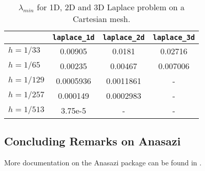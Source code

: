 \begin{table}[htbp]
  \centering
  \begin{tabular}{| l | c c c |}    
    \hline
& {\tt laplace\_1d} & {\tt laplace\_2d} &{\tt laplace\_3d} \\
     \hline
     $h = 1/33$ & 0.00905 & 0.0181 & 0.02716 \\
     $h = 1/65$ & 0.00235  & 0.00467 & 0.007006 \\
     $h = 1/129$ & 0.0005936 & 0.0011861 & - \\
     $h = 1/257$ & 0.000149 & 0.0002983 & - \\
     $h = 1/513$ & 3.75e-5 & - & - \\
     \hline
  \end{tabular}
  \caption{$\lambda_{min}$ for 1D, 2D and 3D Laplace problem on a Cartesian mesh.}
  \label{tab:anasazi:Lapl}
\end{table}




\subsection{Concluding Remarks on Anasazi}
\label{sec:anasazi_concluding}

More documentation on the Anasazi package can be found in
\cite{Anasazi-Ref-Guide,Anasazi-User-Guide}.

